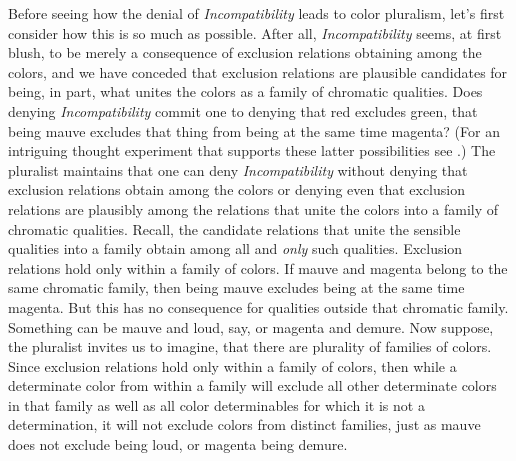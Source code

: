 \documentclass[12pt]{article}
\begin{document}
Before seeing how the denial of \emph{Incompatibility} leads to color pluralism, let's first consider how this is so much as possible. After all, \emph{Incompatibility} seems, at first blush, to be merely a consequence of exclusion relations obtaining among the colors, and we have conceded that exclusion relations are plausible candidates for being, in part, what unites the colors as a family of chromatic qualities. Does denying \emph{Incompatibility} commit one to denying that red excludes green, that being mauve excludes that thing from being at the same time magenta? (For an intriguing thought experiment that supports these latter possibilities see \citealt{Harman:2001mv}.) The pluralist maintains that one can deny \emph{Incompatibility} without denying that exclusion relations obtain among the colors or denying even that exclusion relations are plausibly among the relations that unite the colors into a family of chromatic qualities. Recall, the candidate relations that unite the sensible qualities into a family obtain among all and \emph{only} such qualities. Exclusion relations hold only within a family of colors. If mauve and magenta belong to the same chromatic family, then being mauve excludes being at the same time magenta. But this has no consequence for qualities outside that chromatic family. Something can be mauve and loud, say, or magenta and demure. Now suppose, the pluralist invites us to imagine, that there are plurality of families of colors. Since exclusion relations hold only within a family of colors, then while a determinate color from within a family will exclude all other determinate colors in that family as well as all color determinables for which it is not a determination, it will not exclude colors from distinct families, just as mauve does not exclude being loud, or magenta being demure.
\end{document}
